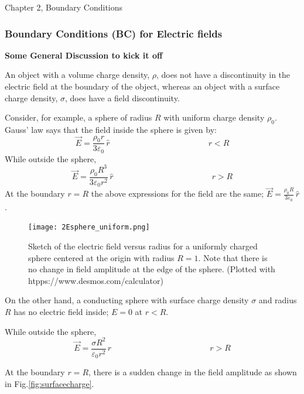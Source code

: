 \documentclass[12pt]{article}
\begin{document}
\begin{flushright} {\color{blue} Chapter 2, Boundary Conditions} \end{flushright}
\begin{flushleft}

\subsubsection*{\bf Boundary Conditions (BC) for Electric fields}

{\bf Some General Discussion to kick it off}

An object with a volume charge density, $\rho$, does not have a discontinuity in the electric field at the boundary of the object, whereas an object with a surface charge density, $\sigma$, does have a field discontinuity. 

Consider, for example, a sphere of radius $R$ with uniform charge density $\rho_{0}$.  Gauss' law says that the field inside the sphere is given by:
\[
\vec{E} = \frac{\rho_{0}r}{3\varepsilon_{0}} \, \hat{r} \hspace{2in} r<R
\]
While outside the sphere,
\[
\vec{E} = \frac{\rho_{0}R^{3}}{3\varepsilon_{0}r^{2}}  \, \hat{r} \hspace{2in} r>R
\]
At the boundary $r=R$ the above expressions for the field are the same; $\vec{E} = \frac{\rho_{0}R}{3\varepsilon_{0}} \, \hat{r}$.
\vspace{.1in}

\begin{figure}[h]
\centering
\texttt{[image: 2Esphere\_uniform.png]}
\caption{Sketch of the electric field versus radius for a uniformly charged sphere centered at the origin with radius $R=1$.  Note that there is no change in field amplitude at the edge of the sphere.  (Plotted with htpps://www.desmos.com/calculator)}
\label{fig:uniformsphere}
\end{figure} 

On the other hand, a conducting sphere with surface charge density $\sigma$ and radius $R$ has no electric field inside; $E=0$ at $r<R$.

While outside the sphere,
\begin{equation}
\vec{E} = \frac{ \sigma R^{2} }{\varepsilon_{0}r^{2}}  \, \hat{r} \hspace{2in} r>R
\label{eq:condsphere}
\end{equation}

At the boundary $r=R$, there is a sudden change in the field amplitude as shown in Fig.\ref{fig:surfacecharge}.
\vspace{.1in}


\end{flushleft}
\end{document}
